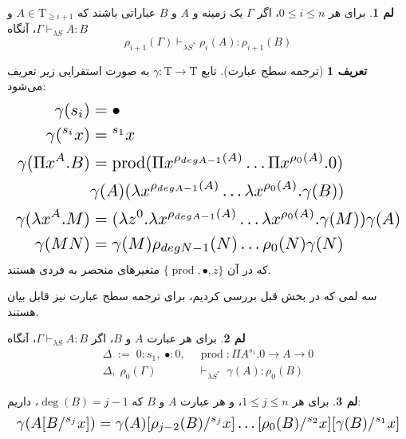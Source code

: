 \documentclass[11pt,twocolumn,a4paper,twoside]{article}
\theoremstyle{definition}
\newtheorem{definition}{تعریف}[section]
\theoremstyle{theorem}
\theoremstyle{definition}
\newtheorem{lemma}{لم}[section]
\theoremstyle{definition}
\theoremstyle{definition}
\theoremstyle{definition}
\theoremstyle{definition}
\newcommand{\resizedalign}[1]{%
  \[
  \resizebox{\columnwidth}{!}{$
    \begin{aligned}
      #1
    \end{aligned}
  $}
  \]
}
\begin{document}
\begin{lemma}
برای هر
$0 \le i \le n$،
اگر
$\Gamma$ یک زمینه و
$A$ و $B$ عباراتی باشند که
$A \in \mathrm{T}_{\ge i+1}$ و $\Gamma \vdash_{\lambda S} A : B$، آنگاه
\vspace{-5pt}
\begin{equation*}
\rho_{i+1}(\Gamma) \vdash_{\lambda S^*} \rho_i(A) : \rho_{i+1}(B)
\end{equation*}
\end{lemma}

\begin{definition}[ترجمه سطح عبارت]\label{gamma_def}
تابع
$\gamma : \mathrm{T} \to \mathrm{T}$
به صورت استقرایی زیر تعریف می‌شود:
\vspace{-5pt}
\[
\resizebox{\columnwidth}{!}{$
\begin{aligned}
\gamma(s_i) &= \bullet\\
\gamma({}^{s_i}x) &= {}^{s_1}x\\
\gamma(\Pi x^A.B) &= \operatorname{prod}(\Pi x^{\rho_{deg A - 1}(A)} \dots \Pi x^{\rho_{0}(A)}.0) \\ &\gamma(A) (\lambda x^{\rho_{deg A - 1}(A)} \dots \lambda x^{\rho_{0}(A)}.\gamma(B))\\
\gamma(\lambda x^A.M) &= (\lambda z^0.\lambda x^{\rho_{deg A - 1}(A)} \dots \lambda x^{\rho_{0}(A)}.\gamma(M)) \gamma(A)\\
\gamma(MN) &= \gamma(M) \rho_{degN-1}(N) \dots \rho_{0}(N) \gamma(N)
\end{aligned}
$}
\]
که در آن
$\{\operatorname{prod}, \bullet, z\}$
متغیرهای منحصر به فردی هستند.
\end{definition}

سه لمی که در بخش قبل بررسی کردیم، برای ترجمه سطح عبارت نیز قابل بیان هستند.

\begin{lemma}\label{preserve_type}
برای هر عبارت
$A$ و $B$،
اگر $\Gamma \vdash_{\lambda S} A:B$، آنگاه
\vspace{-5pt}
\begin{align*}
\Delta \; := \; 0 : s_1,\; \bullet : 0,\; &\operatorname{prod} : \Pi A^{s_1}.0 \to A \to 0\\
\Delta, \; \rho_0(\Gamma) \; &\vdash_{\lambda S^*} \; \gamma(A) : \rho_0(B)
\end{align*}
\end{lemma}

\begin{lemma}
برای هر
$1 \le j \le n$،
و هر عبارت
$A$ و $B$ که $\operatorname{deg}(B) = j-1$، داریم:
\vspace{-5pt}
\resizedalign{
\gamma(A[B/{}^{s_{j}}x]) = \gamma(A) [\rho_{j-2}(B)/{}^{s_{j}}x] \dots [\rho_{0}(B)/{}^{s_{2}}x] [\gamma(B)/{}^{s_{1}}x]
}
\end{lemma}
\end{document}
